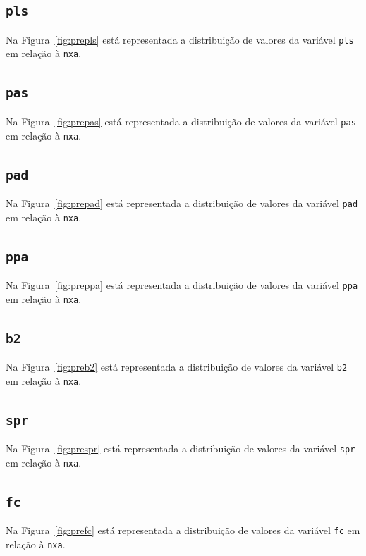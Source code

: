 \documentclass[10pt, conference, compsocconf]{IEEEtran}
\begin{document}
\subsection{\texttt{pls}}
Na Figura~\ref{fig:prepls} está representada a distribuição de valores
da variável {\tt pls} em relação à {\tt nxa}.


\subsection{\texttt{pas}}
Na Figura~\ref{fig:prepas} está representada a distribuição de valores
da variável {\tt pas} em relação à {\tt nxa}.


\subsection{\texttt{pad}}
Na Figura~\ref{fig:prepad} está representada a distribuição de valores
da variável {\tt pad} em relação à {\tt nxa}.


\subsection{\texttt{ppa}}
Na Figura~\ref{fig:preppa} está representada a distribuição de valores
da variável {\tt ppa} em relação à {\tt nxa}.


\subsection{\texttt{b2}}
Na Figura~\ref{fig:preb2} está representada a distribuição de valores
da variável {\tt b2} em relação à {\tt nxa}.


\subsection{\texttt{spr}}
Na Figura~\ref{fig:prespr} está representada a distribuição de valores
da variável {\tt spr} em relação à {\tt nxa}.


\subsection{\texttt{fc}}
Na Figura~\ref{fig:prefc} está representada a distribuição de valores
da variável {\tt fc} em relação à {\tt nxa}.
\end{document}
